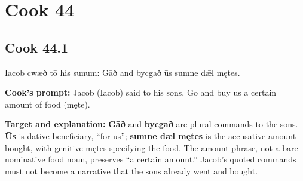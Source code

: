 \clearpage
\section*{Cook 44}

\par\begin{minipage}{\linewidth}\raggedright
\subsection*{Cook 44.1}

Iacob cwæð tō his sunum: Gāð and bycgað ūs sumne dǣl mętes.

\textbf{Cook’s prompt:} Jacob (Iacob) said to his sons, Go and buy us a certain amount of food (męte).

\textbf{Target and explanation:} \textbf{Gāð} and \textbf{bycgað} are plural commands to the sons. \textbf{Ūs} is dative beneficiary, “for us”; \textbf{sumne dǣl mętes} is the accusative amount bought, with genitive mętes specifying the food. The amount phrase, not a bare nominative food noun, preserves “a certain amount.” Jacob’s quoted commands must not become a narrative that the sons already went and bought.

\end{minipage}\par\addvspace{4pt}

